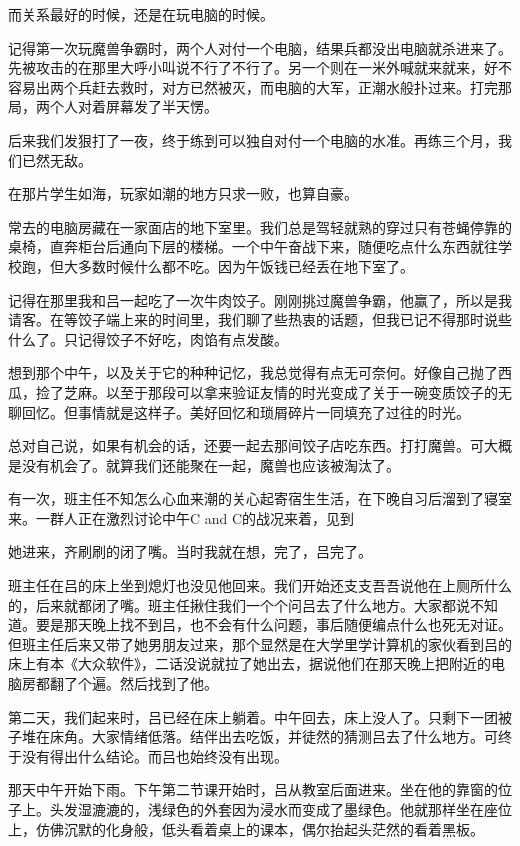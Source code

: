 \documentclass{article}
\begin{document}
而关系最好的时候，还是在玩电脑的时候。

记得第一次玩魔兽争霸时，两个人对付一个电脑，结果兵都没出电脑就杀进来了。先被攻击的在那里大呼小叫说不行了不行了。另一个则在一米外喊就来就来，好不容易出两个兵赶去救时，对方已然被灭，而电脑的大军，正潮水般扑过来。打完那局，两个人对着屏幕发了半天愣。

后来我们发狠打了一夜，终于练到可以独自对付一个电脑的水准。再练三个月，我们已然无敌。

\newpage 

在那片学生如海，玩家如潮的地方只求一败，也算自豪。

常去的电脑房藏在一家面店的地下室里。我们总是驾轻就熟的穿过只有苍蝇停靠的桌椅，直奔柜台后通向下层的楼梯。一个中午奋战下来，随便吃点什么东西就往学校跑，但大多数时候什么都不吃。因为午饭钱已经丢在地下室了。

记得在那里我和吕一起吃了一次牛肉饺子。刚刚挑过魔兽争霸，他赢了，所以是我请客。在等饺子端上来的时间里，我们聊了些热衷的话题，但我已记不得那时说些什么了。只记得饺子不好吃，肉馅有点发酸。

想到那个中午，以及关于它的种种记忆，我总觉得有点无可奈何。好像自己抛了西瓜，捡了芝麻。以至于那段可以拿来验证友情的时光变成了关于一碗变质饺子的无聊回忆。但事情就是这样子。美好回忆和琐屑碎片一同填充了过往的时光。

总对自己说，如果有机会的话，还要一起去那间饺子店吃东西。打打魔兽。可大概是没有机会了。就算我们还能聚在一起，魔兽也应该被淘汰了。


有一次，班主任不知怎么心血来潮的关心起寄宿生生活，在下晚自习后溜到了寝室来。一群人正在激烈讨论中午C
and
C的战况来着，见到

\newpage 

她进来，齐刷刷的闭了嘴。当时我就在想，完了，吕完了。

班主任在吕的床上坐到熄灯也没见他回来。我们开始还支支吾吾说他在上厕所什么的，后来就都闭了嘴。班主任揪住我们一个个问吕去了什么地方。大家都说不知道。要是那天晚上找不到吕，也不会有什么问题，事后随便编点什么也死无对证。但班主任后来又带了她男朋友过来，那个显然是在大学里学计算机的家伙看到吕的床上有本《大众软件》，二话没说就拉了她出去，据说他们在那天晚上把附近的电脑房都翻了个遍。然后找到了他。

第二天，我们起来时，吕已经在床上躺着。中午回去，床上没人了。只剩下一团被子堆在床角。大家情绪低落。结伴出去吃饭，并徒然的猜测吕去了什么地方。可终于没有得出什么结论。而吕也始终没有出现。

那天中午开始下雨。下午第二节课开始时，吕从教室后面进来。坐在他的靠窗的位子上。头发湿漉漉的，浅绿色的外套因为浸水而变成了墨绿色。他就那样坐在座位上，仿佛沉默的化身般，低头看着桌上的课本，偶尔抬起头茫然的看着黑板。
\end{document}

